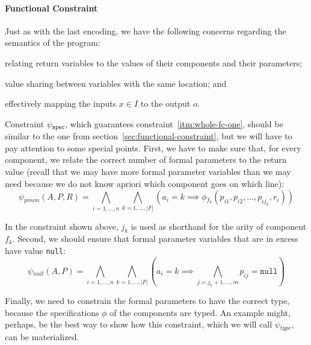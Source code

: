 \paragraph{Functional Constraint}

Just as with the last encoding, we have the following concerns regarding the
semantics of the program:
\begin{enumerate*}[(1)]
\item \label{itm:whole-fc-one} relating return variables to the values of their
components and their parameters;
\item \label{itm:whole-fc-two} value sharing between variables with the same
location; and
\item \label{itm:whole-fc-three} effectively mapping the inputs $x \in I$ to the
output $o$.
\end{enumerate*}

Constraint $\psi{}_{\mathtt{spec}}$, which guarantees
constraint~\ref{itm:whole-fc-one}, should be similar to the one from
section~\ref{sec:functional-constraint}, but we will have to pay attention to
some special points.
First, we have to make sure that, for every component, we relate the correct
number of formal parameters to the return value (recall that we may have more
formal parameter variables than we may need because we do not know apriori which
component goes on which line):
%
\[
  \psi{}_{pnum}(A, P, R) =
  \bigwedge_{i=1,\ldots,n}\bigwedge_{k=1,\ldots,|F|}
  (a_i = k \implies \phi{}_{f_{k}}(p_{i1}, p_{i2}, \ldots, p_{ij_k}, r_i))
\]

\noindent
In the constraint shown above, $j_k$ is used as shorthand for the arity of
component $f_k$.
Second, we should ensure that formal parameter variables that are in excess
have value \lstinline{null}:
%
\[
  \psi{}_{null}(A, P) =
  \bigwedge_{i=1,\ldots,n} \bigwedge_{k=1,\ldots,|F|}
  (a_i = k \implies \bigwedge_{j=j_k+1,\ldots,m} p_{ij} = \mathtt{null})
\]

\noindent
Finally, we need to constrain the formal parameters to have the correct type,
because the specifications $\phi{}$ of the components are typed.
An example might, perhaps, be the best way to show how this constraint, which we
will call $\psi{}_{type}$, can be materialized.


